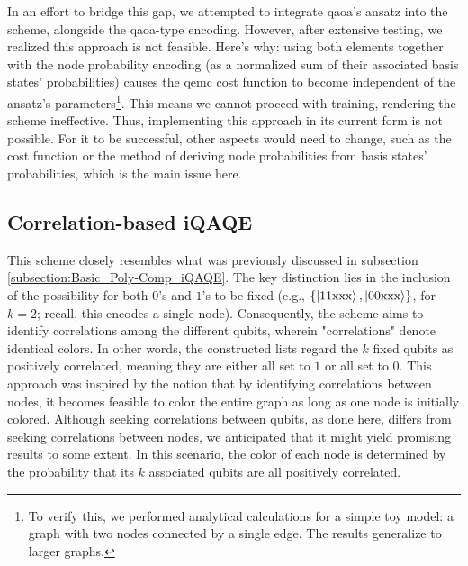 In an effort to bridge this gap, we attempted to integrate \acrshort{qaoa}'s ansatz into the scheme, alongside the \acrshort{qaoa}-type encoding. However, after extensive testing, we realized this approach is not feasible. Here's why: using both elements together with the node probability encoding (as a normalized sum of their associated basis states' probabilities) causes the \acrshort{qemc} cost function to become independent of the ansatz's parameters\footnote{To verify this, we performed analytical calculations for a simple toy model: a graph with two nodes connected by a single edge. The results generalize to larger graphs.}. This means we cannot proceed with training, rendering the scheme ineffective. Thus, implementing this approach in its current form is not possible. For it to be successful, other aspects would need to change, such as the cost function or the method of deriving node probabilities from basis states' probabilities, which is the main issue here.
















\vspace{-2.5mm}
\subsection{Correlation-based iQAQE}
\label{subsection:Correlation_iQAQE}

This scheme closely resembles what was previously discussed in subsection \ref{subsection:Basic_Poly-Comp_iQAQE}. The key distinction lies in the inclusion of the possibility for both $0$'s and $1$'s to be fixed (e.g., $\{\ket{11\text{xxx}}, \ket{00\text{xxx}}\}$, for $k = 2$; recall, this encodes a single node). Consequently, the scheme aims to identify correlations among the different qubits, wherein "correlations" denote identical colors. In other words, the constructed lists regard the $k$ fixed qubits as positively correlated, meaning they are either all set to $1$ or all set to $0$. This approach was inspired by the notion that by identifying correlations between nodes, it becomes feasible to color the entire graph as long as one node is initially colored. Although seeking correlations between qubits, as done here, differs from seeking correlations between nodes, we anticipated that it might yield promising results to some extent. In this scenario, the color of each node is determined by the probability that its $k$ associated qubits are all positively correlated.

